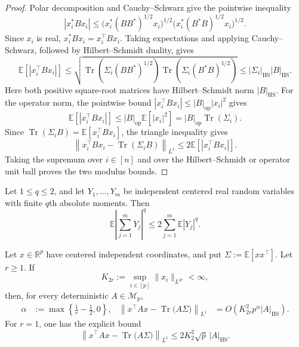 \documentclass[EJP, preprint, NODS, nobera, nofontexpansion]{ejpecp}
\DeclareMathOperator{\op}{op}
\DeclareMathOperator{\tr}{Tr}
\DeclareMathOperator{\hs}{HS}
\begin{document}
\begin{proof}
Polar decomposition and Cauchy--Schwarz give the pointwise inequality
\[
    |x_i^*Bx_i|
    \leq
    \bigl(x_i^*(BB^*)^{1/2}x_i\bigr)^{1/2}
    \bigl(x_i^*(B^*B)^{1/2}x_i\bigr)^{1/2}.
\]
Since $x_i$ is real, $x_i^*Bx_i=x_i^\top Bx_i$. Taking expectations
and applying Cauchy--Schwarz, followed by Hilbert--Schmidt duality, gives
\[
    \mathbb E\left[|x_i^\top Bx_i|\right]
    \leq\sqrt{\tr\!\left(\Sigma_i(BB^*)^{1/2}\right)
               \tr\!\left(\Sigma_i(B^*B)^{1/2}\right)}
    \leq|\Sigma_i|_{\hs}|B|_{\hs}.
\]
Here both positive square-root matrices have Hilbert--Schmidt norm
$|B|_{\hs}$.
For the operator norm, the pointwise bound
$|x_i^\top Bx_i|\leq|B|_{\op}|x_i|^2$ gives
\[
    \mathbb E\left[|x_i^\top Bx_i|\right]
    \leq|B|_{\op}\mathbb E[|x_i|^2]
    =|B|_{\op}\tr(\Sigma_i).
\]
Since $\tr(\Sigma_iB)=\mathbb E[x_i^\top Bx_i]$, the triangle inequality gives
\[
    \left\|x_i^\top Bx_i-\tr(\Sigma_iB)\right\|_{L^1}
    \leq2\mathbb E\left[|x_i^\top Bx_i|\right].
\]
Taking the supremum over $i\in[n]$ and over the Hilbert--Schmidt or
operator unit ball proves the two modulus bounds.
\end{proof}

\begin{theorem}
\label{the:von_bahr_esseen}
Let $1\leq q\leq2$, and let $Y_1,\ldots,Y_m$ be independent centered
real random variables with finite $q$th absolute moments. Then
\[
    \mathbb E\left|\sum_{j=1}^mY_j\right|^q
    \leq 2\sum_{j=1}^m\mathbb E|Y_j|^q.
\]
\end{theorem}

\begin{proposition}
\label{pro:quadratic_form_independent_coordinates_L1}
Let $x\in\mathbb R^p$ have centered independent coordinates, and put
$\Sigma:=\mathbb E[xx^\top]$.
Let \(r\geq1\). If
\[
    K_{2r}:=\sup_{i\in[p]}\|x_i\|_{L^{2r}}<\infty,
\]
then, for every deterministic $A\in\mathcal M_p$,
\begin{align*}
    \alpha&:=\max\left\{\frac1r-\frac12,0\right\},
    &
    \left\|x^{\top}Ax-\tr\bigl(A\Sigma\bigr)\right\|_{L^1}
    &= O\!\left(K_{2r}^2p^\alpha|A|_{\hs}\right).
\end{align*}
For $r=1$, one has the explicit bound
\[
    \left\|x^\top Ax
      -\tr\bigl(A\Sigma\bigr)\right\|_{L^1}
    \leq2K_2^2\sqrt p\,|A|_{\hs}.
\]
\end{proposition}
\end{document}
